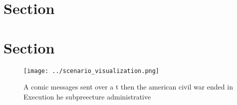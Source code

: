 \documentclass[a4paper]{article}
\begin{document}
\section{Section}

\section{Section}

\begin{figure}
\centering
\texttt{[image: ../scenario\_visualization.png]}
\caption{A comic messages sent over a t then the american civil war ended in Execution he subpreecture administrative 
}
\end{figure}
 
\end{document}
